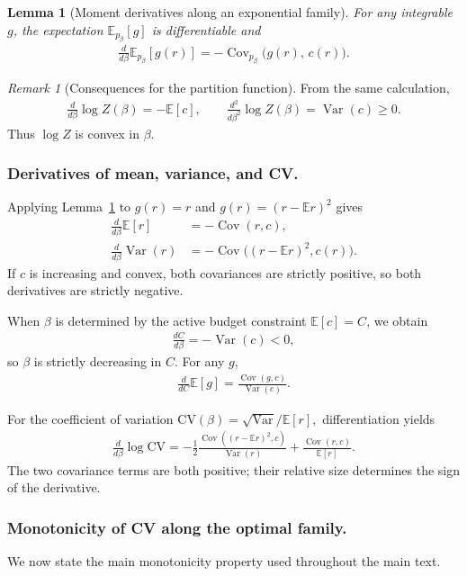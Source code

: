 \documentclass[11pt]{article}
\DeclareMathOperator{\Var}{Var}
\DeclareMathOperator{\Cov}{Cov}
\newcommand{\EE}{\mathbb{E}}
\newtheorem{lemma}[theorem]{Lemma}
\theoremstyle{remark}
\newtheorem{remark}[theorem]{Remark}
\theoremstyle{definition}
\begin{document}
\begin{lemma}[Moment derivatives along an exponential family]
\label{lem:moment-deriv}
For any integrable $g$, the expectation $\EE_{p_\beta}[g]$ is differentiable and
\begin{align}
\frac{d}{d\beta}\EE_{p_\beta}[g(r)]
= -\Cov_{p_\beta}\!\bigl(g(r),\,c(r)\bigr).
\end{align}
\end{lemma}

\begin{remark}[Consequences for the partition function]
From the same calculation,
\begin{align}
\frac{d}{d\beta}\log Z(\beta) = -\EE[c],\qquad
\frac{d^2}{d\beta^2}\log Z(\beta) = \Var(c)\ge 0.
\end{align}
Thus $\log Z$ is convex in $\beta$.
\end{remark}

\subsubsection{Derivatives of mean, variance, and CV.}
Applying Lemma~\ref{lem:moment-deriv} to $g(r)=r$ and 
$g(r)=(r-\EE r)^2$ gives
\begin{align}
\frac{d}{d\beta}\EE[r] &= -\Cov(r,c), \\
\frac{d}{d\beta}\Var(r) &= -\Cov\!\bigl((r-\EE r)^2,c(r)\bigr).
\end{align}
If $c$ is increasing and convex, both covariances are strictly positive, so both derivatives are strictly negative.

When $\beta$ is determined by the active budget constraint 
$\EE[c]=C$, we obtain
\begin{align}
\frac{dC}{d\beta} = -\Var(c)<0,
\end{align}
so $\beta$ is strictly decreasing in $C$.  
For any $g$,
\begin{align}
\frac{d}{dC}\EE[g]
= \frac{\Cov(g,c)}{\Var(c)}.
\end{align}

For the coefficient of variation
\(
\mathrm{CV}(\beta)=\sqrt{\Var}/\EE[r],
\)
differentiation yields
\begin{align}
\frac{d}{d\beta}\log\mathrm{CV}
= -\frac{1}{2}\frac{\Cov((r-\EE r)^2,c)}{\Var(r)}
+ \frac{\Cov(r,c)}{\EE[r]}.
\label{eq:dlogcv}
\end{align}
The two covariance terms are both positive; their relative size determines the sign of the derivative.

\subsubsection{Monotonicity of CV along the optimal family.}
We now state the main monotonicity property used throughout the main text.
\end{document}
